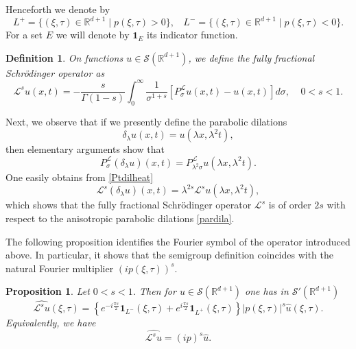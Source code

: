 \documentclass[11pt,letter]{amsart}
\def \RNu {\mathbb{R}^{d+1}}
\def \R {\mathbb{R}}
\def \G{\Gamma}
\newcommand{\la}{\lambda}
\numberwithin{equation}{section}
\newcommand{\Le}{\mathcal L}
\newtheorem{proposition}[theorem]{Proposition}
\newtheorem{definition}[theorem]{Definition}
\numberwithin{equation}{section}
\begin{document}
Henceforth we denote by  
\begin{equation}\label{Lmasomeno}
L^+ = \{(\xi,\tau)\in \R^{d+1}\mid p(\xi,\tau) >0\},\ \ \ \ L^- = \{(\xi,\tau)\in \R^{d+1}\mid p(\xi,\tau) <0\}.
\end{equation}
 For a set $E$ we will denote by $\mathbf 1_E$ its indicator function.

\begin{definition}\label{D:ff} 
On functions $u\in \mathscr S(\RNu)$, we define the \emph{fully fractional} Schr\"odinger operator as  
\begin{equation}\label{fS}
\mathcal L^s u(x,t) = - \frac{s}{\G(1-s)} \int_0^\infty \frac{1}{\sigma^{1+s}} \left[P^{\Le}_\sigma u(x,t) - u(x,t)\right] d\sigma,\ \ \ \ \ 0<s<1.
\end{equation}
\end{definition}


Next, we observe that if we presently define the parabolic dilations 
\begin{equation}\label{pardila}
\delta_\la u(x,t) = u(\la x,\la^2 t),
\end{equation}
then elementary arguments show that
\begin{equation}\label{Ptdilheat}
P^\Le_\sigma(\delta_\la u)(x,t) = P^\Le_{\la^2 \sigma} u(\la x,\la^2 t).
\end{equation}
One easily obtains from \eqref{Ptdilheat}
\begin{equation}\label{dilfracheat}
\Le^s(\delta_\la u)(x,t) = \la^{2s} \Le^s u(\la x,\la^2 t),
\end{equation}  
which shows that the fully fractional Schr\"odinger operator $\Le^s$ is of order $2s$ with respect to the anisotropic parabolic dilations \eqref{pardila}. 

The following proposition identifies the Fourier symbol of the operator introduced above. In particular, it shows that the semigroup definition coincides with the natural Fourier multiplier $(ip(\xi,\tau))^s$.

\begin{proposition}\label{P:FTfp}
Let $0<s<1$. Then for $u\in \mathscr S(\R^{d+1})$ one has in $\mathscr S'(\R^{d+1})$
\begin{equation}\label{fp1}
\widehat{\mathcal L^{s} u}(\xi,\tau) = \left\{e^{-i\frac{\pi s}2} \mathbf 1_{L^-}(\xi,\tau) + e^{i\frac{\pi s}2} \mathbf 1_{L^+}(\xi,\tau)\right\}|p(\xi,\tau)|^{s} \hat u(\xi,\tau).
\end{equation}
Equivalently, we have
\begin{equation}\label{fp2}
\widehat{\mathcal L^{s} u} = (i p)^s \hat u.
\end{equation}
\end{proposition}
\end{document}
